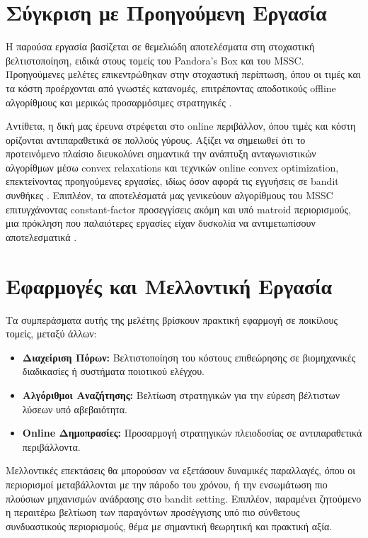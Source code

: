 \documentclass[11pt,a4paper]{article}
\begin{document}
\section{Σύγκριση με Προηγούμενη Εργασία}
Η παρούσα εργασία βασίζεται σε θεμελιώδη αποτελέσματα στη στοχαστική βελτιστοποίηση, ειδικά στους τομείς του Pandora’s Box και του MSSC. Προηγούμενες μελέτες επικεντρώθηκαν στην στοχαστική περίπτωση, όπου οι τιμές και τα κόστη προέρχονται από γνωστές κατανομές, επιτρέποντας αποδοτικούς offline αλγορίθμους και μερικώς προσαρμόσιμες στρατηγικές \cite{weitzman1978optimal, chawla2020pandora}.

Αντίθετα, η δική μας έρευνα στρέφεται στο online περιβάλλον, όπου τιμές και κόστη ορίζονται αντιπαραθετικά σε πολλούς γύρους. Αξίζει να σημειωθεί ότι το προτεινόμενο πλαίσιο διευκολύνει σημαντικά την ανάπτυξη ανταγωνιστικών αλγορίθμων μέσω convex relaxations και τεχνικών online convex optimization, επεκτείνοντας προηγούμενες εργασίες, ιδίως όσον αφορά τις εγγυήσεις σε bandit συνθήκες \cite{gergatsouli2022online}. Επιπλέον, τα αποτελέσματά μας γενικεύουν αλγορίθμους του MSSC επιτυγχάνοντας constant-factor προσεγγίσεις ακόμη και υπό matroid περιορισμούς, μια πρόκληση που παλαιότερες εργασίες είχαν δυσκολία να αντιμετωπίσουν αποτελεσματικά \cite{feige2004approximating}.

\section{Εφαρμογές και Μελλοντική Εργασία}
Τα συμπεράσματα αυτής της μελέτης βρίσκουν πρακτική εφαρμογή σε ποικίλους τομείς, μεταξύ άλλων:
\begin{itemize}
    \item \textbf{Διαχείριση Πόρων:} Βελτιστοποίηση του κόστους επιθεώρησης σε βιομηχανικές διαδικασίες ή συστήματα ποιοτικού ελέγχου.
    \item \textbf{Αλγόριθμοι Αναζήτησης:} Βελτίωση στρατηγικών για την εύρεση βέλτιστων λύσεων υπό αβεβαιότητα.
    \item \textbf{Online Δημοπρασίες:} Προσαρμογή στρατηγικών πλειοδοσίας σε αντιπαραθετικά περιβάλλοντα.
\end{itemize}

Μελλοντικές επεκτάσεις θα μπορούσαν να εξετάσουν δυναμικές παραλλαγές, όπου οι περιορισμοί μεταβάλλονται με την πάροδο του χρόνου, ή την ενσωμάτωση πιο πλούσιων μηχανισμών ανάδρασης στο bandit setting. Επιπλέον, παραμένει ζητούμενο η περαιτέρω βελτίωση των παραγόντων προσέγγισης υπό πιο σύνθετους συνδυαστικούς περιορισμούς, θέμα με σημαντική θεωρητική και πρακτική αξία.
\end{document}
